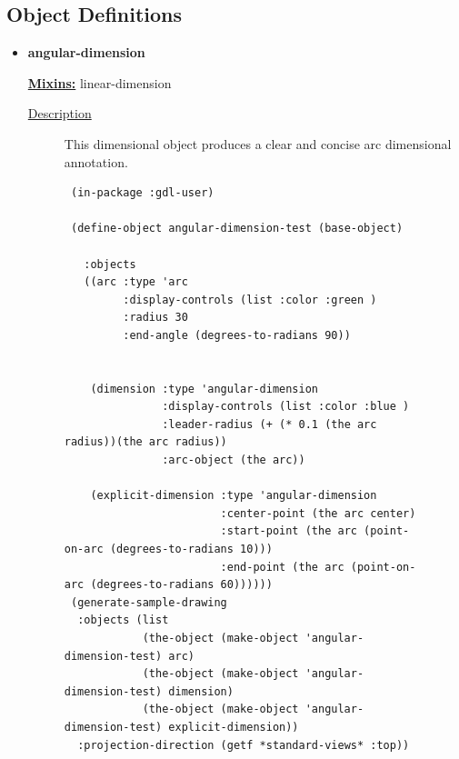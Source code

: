 \documentclass [11pt]{book}
\begin{document}
\subsection{Object Definitions}





\begin{itemize}

\item {}
\label{prim:angular-dimension}
\textbf{angular-dimension}


\textbf{
\underline{Mixins:}} linear-dimension





\begin{description}

\item [
\underline{Description}]


This dimensional object produces a clear and concise arc dimensional annotation.



\end{description}




\begin{figure}
\begin{lrbox}{\boxedverb}
\begin{minipage}{\linewidth}
{\small

\begin{verbatim}
 (in-package :gdl-user)

 (define-object angular-dimension-test (base-object) 
   
   :objects 
   ((arc :type 'arc
         :display-controls (list :color :green )
         :radius 30
         :end-angle (degrees-to-radians 90))
    
    
    (dimension :type 'angular-dimension
               :display-controls (list :color :blue )
               :leader-radius (+ (* 0.1 (the arc radius))(the arc radius))
               :arc-object (the arc))
    
    (explicit-dimension :type 'angular-dimension
                        :center-point (the arc center)
                        :start-point (the arc (point-on-arc (degrees-to-radians 10)))
                        :end-point (the arc (point-on-arc (degrees-to-radians 60))))))
 (generate-sample-drawing 
  :objects (list 
            (the-object (make-object 'angular-dimension-test) arc) 
            (the-object (make-object 'angular-dimension-test) dimension)
            (the-object (make-object 'angular-dimension-test) explicit-dimension))
  :projection-direction (getf *standard-views* :top))
 

\end{verbatim}}
\end{minipage}
\end{lrbox}
\end{figure}
\end{itemize}
\end{document}
